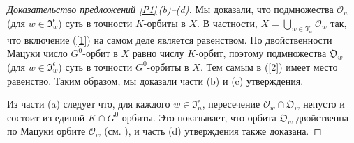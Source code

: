 \documentclass{amsart}
\theoremstyle{definition}
\begin{document}
\begin{proof}[Доказательство предложений \ref{P1}\,{\rm (b)}--{\rm (d)}]
Мы доказали, что подмножества $\mathcal{O}_w$ (для
$w\in\mathfrak{I}^\epsilon_w$) суть в точности $K$-орбиты в $X$. В частности, $X=\bigcup_{w\in\mathfrak{I}^\epsilon_w}\mathcal{O}_w$ так, что включение (\ref{1}) на самом деле является равенством. По двойственности Мацуки число $G^0$-орбит в $X$ равно числу
$K$-орбит, поэтому подмножества $\mathfrak{O}_w$ (для
$w\in\mathfrak{I}^\epsilon_w$) суть в точности $G^0$-орбиты в $X$.
Тем самым в (\ref{2})  имеет место равенство. Таким образом, мы доказали части
{\rm (b)} и {\rm (c)} утверждения.

Из части (a) следует что,  для каждого $w\in\mathfrak{I}_n^\epsilon$, пересечение $\mathcal{O}_w\cap\mathfrak{O}_w$ непусто и состоит из единой $K\cap G^0$-орбиты.
Это показывает, что орбита $\mathfrak{O}_w$ двойственна по Мацуки орбите $\mathcal{O}_w$ (см. \cite{Matsuki3}), и часть {\rm (d)} утверждения также доказана.
\end{proof}
\end{document}
